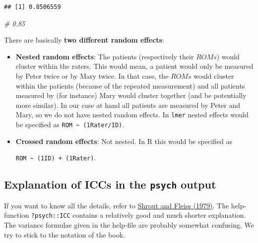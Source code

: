 \documentclass[
]{book}
\newenvironment{Shaded}{\begin{snugshade}}{\end{snugshade}}
\newcommand{\CommentTok}[1]{\textcolor[rgb]{0.56,0.35,0.01}{\textit{#1}}}
\begin{document}
\begin{verbatim}
## [1] 0.8506559
\end{verbatim}

\begin{Shaded}
\begin{Highlighting}[]
\CommentTok{\# 0.85}
\end{Highlighting}
\end{Shaded}

There are basically \textbf{two different random effects}:

\begin{itemize}
\item
  \textbf{Nested random effects}: The patients (respectively their \(ROMs\)) would cluster within the raters.
  This would mean, a patient would only be measured by Peter twice or by Mary twice.
  In that case, the \(ROMs\) would cluster within the patients (because of the repeated measurement)
  and all patients measured by (for instance) Mary would cluster together (and be potentially more similar).
  In our case at hand all patients are measured by Peter and Mary, so we do not have nested random effects.
  In \texttt{lmer} nested effects would be specified as \texttt{ROM\ \textasciitilde{}\ (1\textbar{}Rater/ID)}.
\item
  \textbf{Crossed random effects}:
  Not nested.
  In R this would be specified as

  \texttt{ROM\ \textasciitilde{}\ (1\textbar{}ID)\ +\ (1\textbar{}Rater)}.
\end{itemize}

\subsection{\texorpdfstring{Explanation of ICCs in the \texttt{psych} output}{Explanation of ICCs in the psych output}}\label{explanation-of-iccs-in-the-psych-output}

If you want to know all the details, refer to \href{https://d1wqtxts1xzle7.cloudfront.net/50483847/syarat_reliabilitas_icc-libre.pdf?1479841049=&response-content-disposition=inline\%3B+filename\%3DIntraclass_Correlations_Uses_in_Assessin.pdf&Expires=1740684631&Signature=hHiFbcQD3PDVIyWDJ-bUhcm3WtsK19YhHm6FKtnafNdqsm9NhR6cr9lbCf~gVV5SYG1XlTwLlcfJkQ9Z-ahjmmNV893aWi5plo~yL4oZBEjrmFa9WCd7k6vzFTkri1Xbgfh~GyPARWXBtqABytovtL-RD1420Kw9qk150nw3-kUWcuvRiIc~r0y65XQaXf-V9mm~uXRFdUqec4Vs-Bwh~IrJfHWQASGgp8wZjzh2130MCP3-iaorxNn~79c~nm2f1aIl5WRqRXB6EIy8HlrNFpxNSt1pgTPZoZadEECM4qH395KLY5ijUnhoCDT9AmcOplPnFiC5t8dKW-n25ziofQ__&Key-Pair-Id=APKAJLOHF5GGSLRBV4ZA}{Shrout and Fleiss (1979)}.
The help-function \texttt{?psych::ICC} contains a relatively good and much shorter explanation.
The variance formulae given in the help-file are probably somewhat confusing.
We try to stick to the notation of the book.
\end{document}

